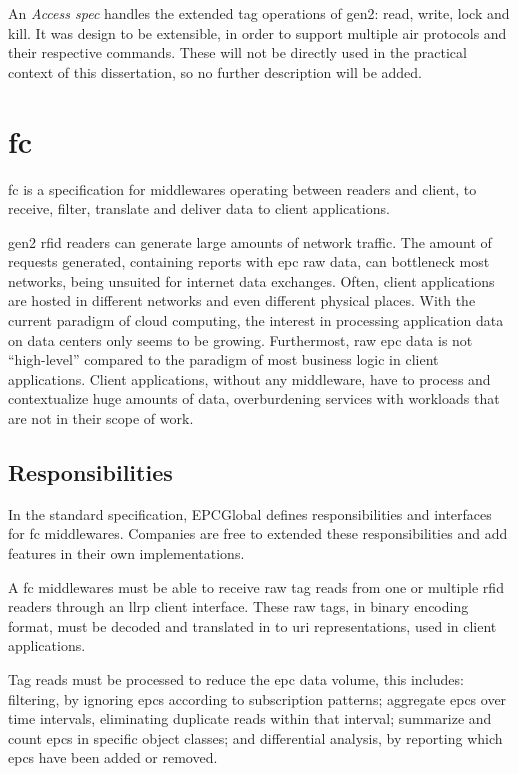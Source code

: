 An \emph{Access \ac{spec}} handles the extended tag operations of \ac{gen2}: read, write, lock and kill.
It was design to be extensible, in order to support multiple air protocols and their respective commands.
These will not be directly used in the practical context of this dissertation, so no further description will be added.

\section{\acf{fc}}

\ac{fc} is a specification for middlewares operating between readers and client, to receive, filter, translate and deliver data to client applications.

\ac{gen2} \ac{rfid} readers can generate large amounts of network traffic. The amount of requests generated, containing reports with \ac{epc} raw data, can bottleneck most networks, being unsuited for internet data exchanges. 
Often, client applications are hosted in different networks and even different physical places. With the current paradigm of cloud computing, the interest in processing application data on data centers only seems to be growing.
Furthermost, raw \ac{epc} data is not ``high-level'' compared to the paradigm of most business logic in client applications.
Client applications, without any middleware, have to process and contextualize huge amounts of data, overburdening services with workloads that are not in their scope of work.

\subsection{Responsibilities}

In the standard specification, EPCGlobal defines responsibilities and interfaces for \ac{fc} middlewares. Companies are free to extended these responsibilities and add features in their own implementations.

A \ac{fc} middlewares must be able to receive raw tag reads from one or multiple \ac{rfid} readers through an \ac{llrp} client interface.
These raw tags, in binary encoding format, must be decoded and translated in to \ac{uri} representations, used in client applications.

Tag reads must be processed to reduce the \ac{epc} data volume, this includes: filtering, by ignoring \acp{epc} according to subscription patterns; 
aggregate \acp{epc} over time intervals, eliminating duplicate reads within that interval;
summarize and count \acp{epc} in specific object classes;
and differential analysis, by reporting which \acp{epc} have been added or removed.

